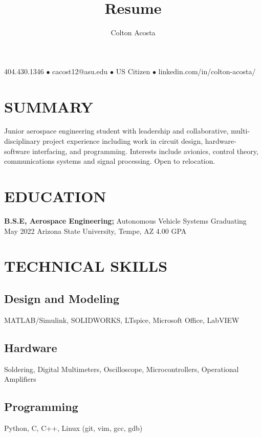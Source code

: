 \documentclass{article}
\makeatletter
\renewcommand{\maketitle}{
	\begin{center}
		{\huge\bfseries
			\theauthor}
			
		404.430.1346 $\bullet$ cacost12@asu.edu $\bullet$ US Citizen $\bullet$ linkedin.com/in/colton-acosta/
	\end{center}
}
\makeatother
\begin{document}
\title{Resume}
\author{Colton Acosta}
\maketitle
\section{SUMMARY}
Junior aerospace engineering student with leadership and collaborative, multi-disciplinary project experience including work in circuit design, hardware-software interfacing, and programming. Interests include avionics, control theory, communications systems and signal processing. Open to relocation.
\section{EDUCATION}
\textbf{B.S.E, Aerospace Engineering;} Autonomous Vehicle Systems
\hfill 
Graduating May 2022
\linebreak
Arizona State University, Tempe, AZ 
\hfill
4.00 GPA

\section{TECHNICAL SKILLS}
\subsection{Design and Modeling}
MATLAB/Simulink, SOLIDWORKS, LTspice, Microsoft Office, LabVIEW
\subsection{Hardware}
Soldering, Digital Multimeters, Oscilloscope, Microcontrollers, Operational Amplifiers
\subsection{Programming} 
Python, C, C++, Linux (git, vim, gcc, gdb)
\end{document}
